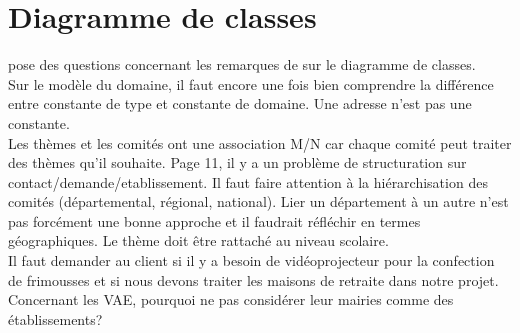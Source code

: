 \documentclass [a4paper] {article}
\begin{document}
\section{Diagramme de classes}
\Julie{} pose des questions concernant les remarques de \nomTuteurPedago{} sur le diagramme de classes.\\
Sur le modèle du domaine, il faut encore une fois bien comprendre la différence entre constante de type et constante de domaine. Une adresse n'est pas une constante. \\
Les thèmes et les comités ont une association M/N car chaque comité peut traiter des thèmes qu'il souhaite. Page 11, il y a un problème de structuration sur contact/demande/etablissement. Il faut faire attention à la hiérarchisation des comités (départemental, régional, national). Lier un département à un autre n'est pas forcément une bonne approche et il faudrait réfléchir en termes géographiques. Le thème doit être rattaché au niveau scolaire.\\
Il faut demander au client si il y a besoin de vidéoprojecteur pour la confection de frimousses et si nous devons traiter les maisons de retraite dans notre projet. Concernant les VAE, pourquoi ne pas considérer leur mairies comme des établissements?


\newpage
\end{document}
